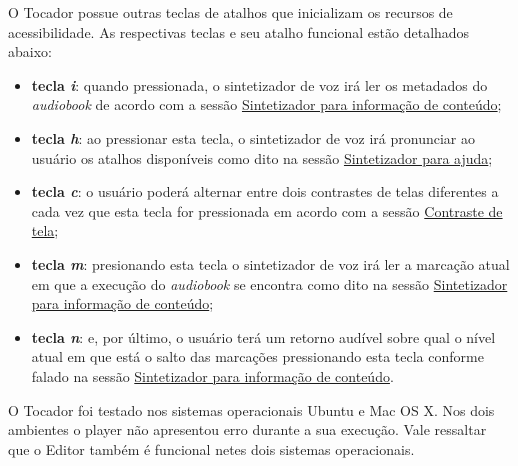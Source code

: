 O Tocador possue outras teclas de atalhos que inicializam os recursos de acessibilidade. As respectivas teclas e seu atalho funcional estão detalhados abaixo:

\begin{itemize}
	\item{\textbf{tecla \textit{i}}:} quando pressionada, o sintetizador de voz irá ler os metadados do \textit{audiobook} de acordo com a sessão \hyperref[ttscontent]{Sintetizador para informação de conteúdo};
	\item{\textbf{tecla \textit{h}}:} ao pressionar esta tecla, o sintetizador de voz irá pronunciar ao usuário os atalhos disponíveis como dito na sessão \hyperref[ttshelp]{Sintetizador para ajuda};
	\item{\textbf{tecla \textit{c}}:} o usuário poderá alternar entre dois contrastes de telas diferentes a cada vez que esta tecla for pressionada em acordo com a sessão \hyperref[ttscontraste]{Contraste de tela};
	\item{\textbf{tecla \textit{m}}:} presionando esta tecla o sintetizador de voz irá ler a marcação atual em que a execução do \textit{audiobook} se encontra como dito na sessão \hyperref[ttscontent]{Sintetizador para informação de conteúdo};
	\item{\textbf{tecla \textit{n}}:} e, por último, o usuário terá um retorno audível sobre qual o nível atual em que está o salto das marcações pressionando esta tecla conforme falado na sessão \hyperref[ttscontent]{Sintetizador para informação de conteúdo}.
\end{itemize}

O Tocador foi testado nos sistemas operacionais Ubuntu e Mac OS X. Nos dois ambientes o player não apresentou erro durante a sua execução. Vale ressaltar que o Editor também é funcional netes dois sistemas operacionais.
